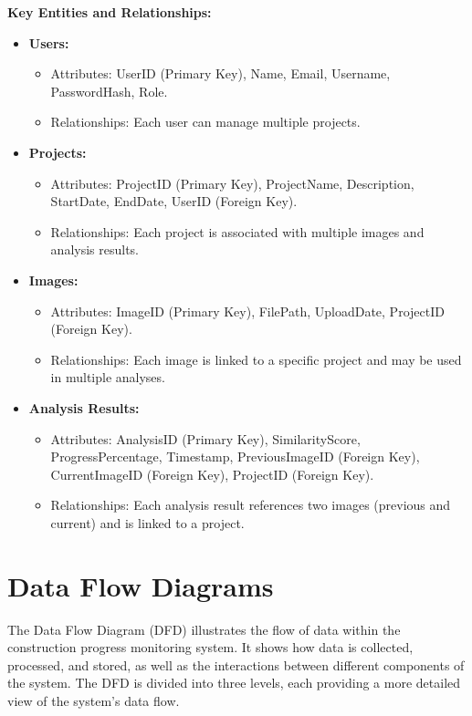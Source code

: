 \textbf{Key Entities and Relationships:}
\begin{itemize}
    \item \textbf{Users:}
    \begin{itemize}
        \item Attributes: UserID (Primary Key), Name, Email, Username, PasswordHash, Role.
        \item Relationships: Each user can manage multiple projects.
    \end{itemize}
    \item \textbf{Projects:}
    \begin{itemize}
        \item Attributes: ProjectID (Primary Key), ProjectName, Description, StartDate, EndDate, UserID (Foreign Key).
        \item Relationships: Each project is associated with multiple images and analysis results.
    \end{itemize}
    \item \textbf{Images:}
    \begin{itemize}
        \item Attributes: ImageID (Primary Key), FilePath, UploadDate, ProjectID (Foreign Key).
        \item Relationships: Each image is linked to a specific project and may be used in multiple analyses.
    \end{itemize}
    \item \textbf{Analysis Results:}
    \begin{itemize}
        \item Attributes: AnalysisID (Primary Key), SimilarityScore, ProgressPercentage, Timestamp, PreviousImageID (Foreign Key), CurrentImageID (Foreign Key), ProjectID (Foreign Key).
        \item Relationships: Each analysis result references two images (previous and current) and is linked to a project.
    \end{itemize}
\end{itemize}

\section{Data Flow Diagrams}
The Data Flow Diagram (DFD) illustrates the flow of data within the construction progress monitoring system. It shows how data is collected, processed, and stored, as well as the interactions between different components of the system. The DFD is divided into three levels, each providing a more detailed view of the system's data flow.
